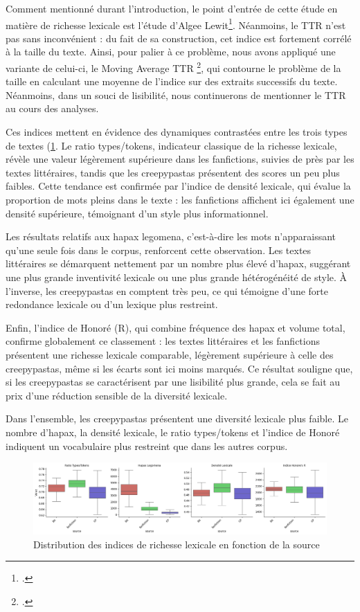 \documentclass[12pt,a4paper,oneside,titlepage]{book} %
\begin{document}
Comment mentionné durant l'introduction, le point d'entrée de cette étude en matière de richesse lexicale est l'étude d'Algee Lewit\footcite{algee2016canon}. Néanmoins, le TTR n'est pas sans inconvénient : du fait de sa construction, cet indice est fortement corrélé à la taille du texte. Ainsi, pour palier à ce problème, nous avons appliqué une variante de celui-ci, le Moving Average TTR \footcite{covington2010cutting}, qui contourne le problème de la taille en calculant une moyenne de l'indice sur des extraits successifs du texte. Néanmoins, dans un souci de lisibilité, nous continuerons de mentionner le TTR au cours des analyses.

Ces indices mettent en évidence des dynamiques contrastées entre les trois types de textes (\ref{fig:richeness_source}. Le ratio types/tokens, indicateur classique de la richesse lexicale, révèle une valeur légèrement supérieure dans les fanfictions, suivies de près par les textes littéraires, tandis que les creepypastas présentent des scores un peu plus faibles. Cette tendance est confirmée par l’indice de densité lexicale, qui évalue la proportion de mots pleins dans le texte : les fanfictions affichent ici également une densité supérieure, témoignant d’un style plus informationnel.

Les résultats relatifs aux hapax legomena, c’est-à-dire les mots n’apparaissant qu’une seule fois dans le corpus, renforcent cette observation. Les textes littéraires se démarquent nettement par un nombre plus élevé d’hapax, suggérant une plus grande inventivité lexicale ou une plus grande hétérogénéité de style. À l’inverse, les creepypastas en comptent très peu, ce qui témoigne d’une forte redondance lexicale ou d’un lexique plus restreint.

Enfin, l’indice de Honoré (R), qui combine fréquence des hapax et volume total, confirme globalement ce classement : les textes littéraires et les fanfictions présentent une richesse lexicale comparable, légèrement supérieure à celle des creepypastas, même si les écarts sont ici moins marqués. Ce résultat souligne que, si les creepypastas se caractérisent par une lisibilité plus grande, cela se fait au prix d’une réduction sensible de la diversité lexicale.

Dans l'ensemble, les creepypastas présentent une diversité lexicale plus faible. Le nombre d’hapax, la densité lexicale, le ratio types/tokens et l’indice de Honoré indiquent un vocabulaire plus restreint que dans les autres corpus. 

\begin{figure}
    \centering
    \includegraphics[width=0.5\linewidth]{illustration/richness_per_source.png}
    \caption{Distribution des indices de richesse lexicale en fonction de la source}
    \label{fig:richeness_source}
\end{figure}
\end{document}

